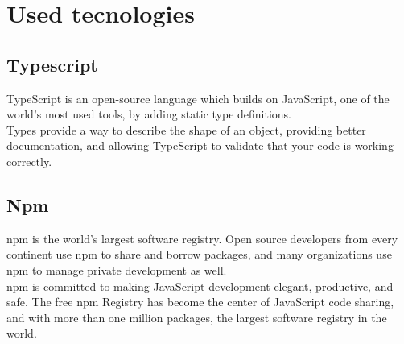 \section{Used tecnologies}
\subsection{Typescript}
TypeScript is an open-source language which builds on JavaScript, one of the world’s most used tools, by adding static type definitions.\\
Types provide a way to describe the shape of an object, providing better documentation, and allowing TypeScript to validate that your code is working correctly.

\subsection{Npm}
npm is the world’s largest software registry. Open source developers from every continent use npm to share and borrow packages, and many organizations use npm to manage private development as well.\\
npm is committed to making JavaScript development elegant, productive, and safe. The free npm Registry has become the center of JavaScript code sharing, and with more than one million packages, the largest software registry in the world. 